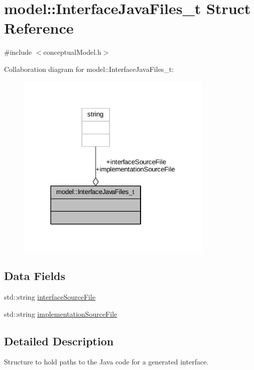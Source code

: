 \hypertarget{structmodel_1_1_interface_java_files__t}{}\section{model\+:\+:Interface\+Java\+Files\+\_\+t Struct Reference}
\label{structmodel_1_1_interface_java_files__t}


{\ttfamily \#include $<$conceptual\+Model.\+h$>$}



Collaboration diagram for model\+:\+:Interface\+Java\+Files\+\_\+t\+:
\nopagebreak
\begin{figure}[H]
\begin{center}
\leavevmode
\includegraphics[width=266pt]{structmodel_1_1_interface_java_files__t__coll__graph}
\end{center}
\end{figure}
\subsection*{Data Fields}
\begin{DoxyCompactItemize}
\item 
std\+::string \hyperlink{structmodel_1_1_interface_java_files__t_a71f5f7da2a0bb3a7288080b3f5c28b81}{interface\+Source\+File}
\item 
std\+::string \hyperlink{structmodel_1_1_interface_java_files__t_a36586bfb684e618a1ddaa03a9319fa0f}{implementation\+Source\+File}
\end{DoxyCompactItemize}


\subsection{Detailed Description}
Structure to hold paths to the Java code for a generated interface. 

